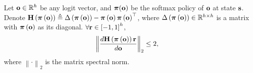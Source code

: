 \begin{lem}
\label{lem:Hr_spectral_norm_upper_bound}
    Let ${\mathbf{o}} \in {\mathbb{R}}^h$ be any logit vector, and ${\boldsymbol{\pi}}({\mathbf{o}})$ be the softmax policy of ${\mathbf{o}}$ at state ${\mathbf{s}}$. Denote ${\mathbf{H}}\left( {\boldsymbol{\pi}} \left({\mathbf{o}} \right) \right) \triangleq \Delta \left( {\boldsymbol{\pi}} \left({\mathbf{o}} \right) \right) - {\boldsymbol{\pi}} \left({\mathbf{o}} \right) {\boldsymbol{\pi}} \left({\mathbf{o}} \right)^\top$, where $\Delta \left( {\boldsymbol{\pi}} \left({\mathbf{o}} \right) \right) \in {\mathbb{R}}^{h \times h}$ is a matrix with ${\boldsymbol{\pi}} \left({\mathbf{o}} \right)$ as its diagonal. $\forall {\mathbf{r}} \in \left[ -1, 1\right]^h$,
\begin{equation*}
    \left\| \frac{d {\mathbf{H}}\left( {\boldsymbol{\pi}} \left({\mathbf{o}} \right) \right) {\mathbf{r}}}{d {\mathbf{o}} } \right\|_2 \le 2,
\end{equation*}
where $\left\| \cdot \right\|_2$ is the matrix spectral norm.
\end{lem}
